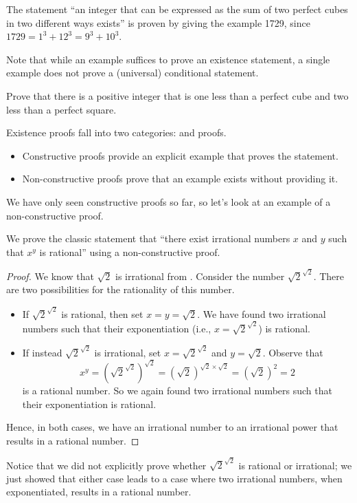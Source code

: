 \begin{example}
    The statement ``an integer that can be expressed as the sum of two perfect cubes in two different ways exists'' is proven by giving the example 1729, since $1729 = 1^3 + 12^3 = 9^3 + 10^3$.
\end{example}

Note that while an example suffices to prove an existence statement, a single example does not prove a (universal) conditional statement.

\begin{exercise}
    Prove that there is a positive integer that is one less than a perfect cube and two less than a perfect square.
\end{exercise}

Existence proofs fall into two categories:  and  proofs.
\begin{itemize}
    \item Constructive proofs provide an explicit example that proves the statement.
    \item Non-constructive proofs prove that an example exists without providing it.
\end{itemize}
We have only seen constructive proofs so far, so let's look at an example of a non-constructive proof.

\begin{example}
    We prove the classic statement that ``there exist irrational numbers $x$ and $y$ such that $x^y$ is rational'' using a non-constructive proof.
    \begin{proof}
        We know that $\sqrt2$ is irrational from . Consider the number $\sqrt2^{\sqrt2}$. There are two possibilities for the rationality of this number.
        \begin{itemize}
            \item If $\sqrt2^{\sqrt2}$ is rational, then set $x = y = \sqrt2$. We have found two irrational numbers such that their exponentiation (i.e.,  $x = \sqrt2^{\sqrt2}$) is rational.
            \item If instead $\sqrt2^{\sqrt2}$ is irrational, set $x = \sqrt2^{\sqrt2}$ and $y = \sqrt2$. Observe that
            \[
                x^y = \left(\sqrt2^{\sqrt2}\right)^{\sqrt2} = (\sqrt2)^{\sqrt2 \times \sqrt2} = (\sqrt2)^2 = 2
            \]
            is a rational number. So we again found two irrational numbers such that their exponentiation is rational.
        \end{itemize}
        Hence, in both cases, we have an irrational number to an irrational power that results in a rational number.
    \end{proof}

    Notice that we did not explicitly prove whether $\sqrt2^{\sqrt2}$ is rational or irrational; we just showed that either case leads to a case where two irrational numbers, when exponentiated, results in a rational number.
\end{example}

